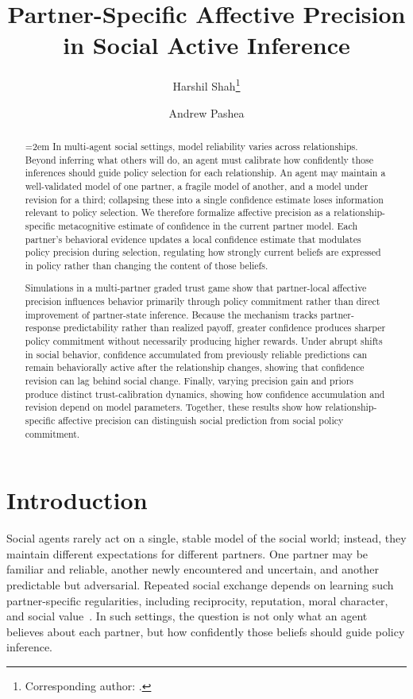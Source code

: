 \documentclass[runningheads,orivec]{llncs}
\title{Partner-Specific Affective Precision in Social Active Inference}
\author{Harshil Shah\inst{1}\orcidID{\href{https://orcid.org/0009-0006-0145-9958}{0009-0006-0145-9958}}\thanks{Corresponding author: \email{28hshah@gmail.com}.} \and
Andrew Pashea\inst{2}\orcidID{\href{https://orcid.org/0009-0004-4061-6296}{0009-0004-4061-6296}}}
\institute{Mission San Jose High School, Fremont, CA, USA
\and
Division of the Social Sciences, University of Chicago, Chicago, IL, USA}
\begin{document}
\raggedbottom
\maketitle

\begin{abstract}
\emergencystretch=2em
In multi-agent social settings, model reliability varies across relationships. Beyond inferring what others will do, an agent must calibrate how confidently those inferences should guide policy selection for each relationship. An agent may maintain a well-validated model of one partner, a fragile model of another, and a model under revision for a third; collapsing these into a single confidence estimate loses information relevant to policy selection. We therefore formalize affective precision as a relationship-specific metacognitive estimate of confidence in the current partner model. Each partner's behavioral evidence updates a local confidence estimate that modulates policy precision during selection, regulating how strongly current beliefs are expressed in policy rather than changing the content of those beliefs.

Simulations in a multi-partner graded trust game show that partner-local affective precision influences behavior primarily through policy commitment rather than direct improvement of partner-state inference. Because the mechanism tracks partner-response predictability rather than realized payoff, greater confidence produces sharper policy commitment without necessarily producing higher rewards. Under abrupt shifts in social behavior, confidence accumulated from previously reliable predictions can remain behaviorally active after the relationship changes, showing that confidence revision can lag behind social change. Finally, varying precision gain and priors produce distinct trust-calibration dynamics, showing how confidence accumulation and revision depend on model parameters. Together, these results show how relationship-specific affective precision can distinguish social prediction from social policy commitment.

\end{abstract}
\section{Introduction}

Social agents rarely act on a single, stable model of the social world; instead, they maintain different expectations for different partners. One partner may be familiar and reliable, another newly encountered and uncertain, and another predictable but adversarial. Repeated social exchange depends on learning such partner-specific regularities, including reciprocity, reputation, moral character, and social value~\cite{Behrens2008SocialLearning,Delgado2005MoralCharacter,KingCasas2005Trust}. In such settings, the question is not only what an agent believes about each partner, but how confidently those beliefs should guide policy inference.
\end{document}
